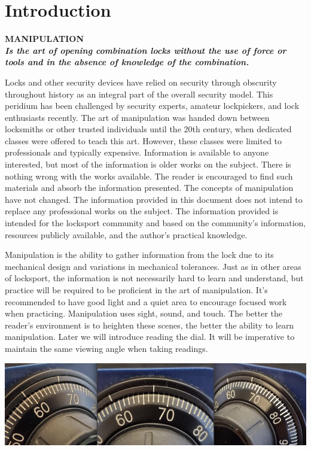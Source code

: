 \documentclass[11pt, letterpaper]{article}
\begin{document}
\section*{Introduction}
\begin{center}
  \textbf{MANIPULATION \\
    \textit{Is the art of opening combination locks without the use of force
      or tools and in the absence of knowledge of the combination.}}
\end{center}

Locks and other security devices have relied on security through obscurity
throughout history as an integral part of the overall security model. This
peridium has been challenged by security experts, amateur lockpickers, and lock
enthusiasts recently. The art of manipulation was handed down between
locksmiths or other trusted individuals until the 20th century, when dedicated
classes were offered to teach this art. However, these classes were limited to
professionals and typically expensive. Information is available to anyone
interested, but most of the information is older works on the subject. There is
nothing wrong with the works available. The reader is encouraged to find such
materials and absorb the information presented. The concepts of manipulation
have not changed. The information provided in this document does not intend to
replace any professional works on the subject. The information provided is
intended for the locksport community and based on the community's information,
resources publicly available, and the author's practical knowledge.

Manipulation is the ability to gather information from the lock due to its
mechanical design and variations in mechanical tolerances. Just as in other
areas of locksport, the information is not necessarily hard to learn and
understand, but practice will be required to be proficient in the art of
manipulation. It's recommended to have good light and a quiet area to encourage
focused work when practicing. Manipulation uses sight, sound, and touch. The
better the reader's environment is to heighten these scenes, the better the
ability to learn manipulation. Later we will introduce reading the dial. It
will be imperative to maintain the same viewing angle when taking readings.

\noindent\includegraphics[width=\textwidth]{viewAngle}
\end{document}
